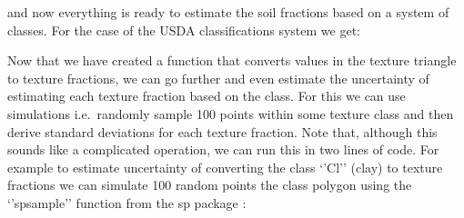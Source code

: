 \documentclass[11pt]{krantz}
\newenvironment{Shaded}{\begin{snugshade}}{\end{snugshade}}
\newcommand{\CommentTok}[1]{\textcolor[rgb]{0.37,0.37,0.37}{\textit{#1}}}
\newcommand{\DecValTok}[1]{\textcolor[rgb]{0.06,0.06,0.06}{#1}}
\newcommand{\KeywordTok}[1]{\textcolor[rgb]{0.27,0.27,0.27}{\textbf{#1}}}
\newcommand{\NormalTok}[1]{#1}
\newcommand{\OperatorTok}[1]{\textcolor[rgb]{0.43,0.43,0.43}{\textbf{#1}}}
\newcommand{\StringTok}[1]{\textcolor[rgb]{0.5,0.5,0.5}{#1}}
\theoremstyle{definition}
\theoremstyle{definition}
\theoremstyle{definition}
\theoremstyle{remark}
\begin{document}
and now everything is ready to estimate the soil fractions based on a
system of classes. For the case of the USDA classifications system we
get:

\begin{Shaded}
\end{Shaded}

Now that we have created a function that converts values in the texture
triangle to texture fractions, we can go further and even estimate the
uncertainty of estimating each texture fraction based on the class. For
this we can use simulations i.e.~randomly sample 100 points within some
texture class and then derive standard deviations for each texture
fraction. Note that, although this sounds like a complicated operation,
we can run this in two lines of code. For example to estimate
uncertainty of converting the class `'Cl'' (clay) to texture fractions
we can simulate 100 random points the class polygon using the
`'spsample'' function from the sp package \citep{Bivand2013Springer}:
\end{document}
